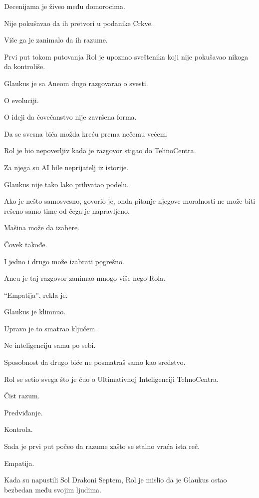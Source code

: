 Decenijama je živeo među domorocima.

Nije pokušavao da ih pretvori u podanike Crkve.

Više ga je zanimalo da ih razume.

\bigskip

Prvi put tokom putovanja Rol je upoznao sveštenika koji nije pokušavao nikoga da kontroliše.

\bigskip

Glaukus je sa Aneom dugo razgovarao o svesti.

O evoluciji.

O ideji da čovečanstvo nije završena forma.

Da se svesna bića možda kreću prema nečemu većem.

\bigskip

Rol je bio nepoverljiv kada je razgovor stigao do TehnoCentra.

Za njega su AI bile neprijatelj iz istorije.

Glaukus nije tako lako prihvatao podelu.

Ako je nešto samosvesno, govorio je, onda pitanje njegove moralnosti ne može biti rešeno samo time od čega je napravljeno.

Mašina može da izabere.

Čovek takođe.

I jedno i drugo može izabrati pogrešno.

\bigskip

Aneu je taj razgovor zanimao mnogo više nego Rola.

``Empatija'', rekla je.

Glaukus je klimnuo.

Upravo je to smatrao ključem.

Ne inteligenciju samu po sebi.

Sposobnost da drugo biće ne posmatraš samo kao sredstvo.

\bigskip

Rol se setio svega što je čuo o Ultimativnoj Inteligenciji TehnoCentra.

Čist razum.

Predviđanje.

Kontrola.

Sada je prvi put počeo da razume zašto se stalno vraća ista reč.

Empatija.

\bigskip

Kada su napustili Sol Drakoni Septem, Rol je mislio da je Glaukus ostao bezbedan među svojim ljudima.

